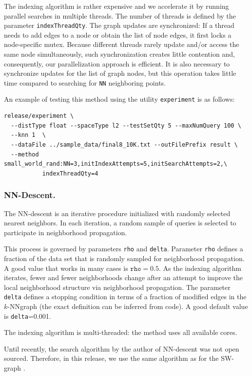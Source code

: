 \documentclass[runningheads,a4paper]{llncs}
\newcommand{\ttt}[1]{\texttt{#1}}
\newcommand{\knnns}{$k$-NN}
\begin{document}
The indexing algorithm is rather expensive and we accelerate it by running parallel searches in multiple threads. The number of threads is defined by the parameter \ttt{indexThreadQty}.
The graph updates are synchronized: If a thread  needs to add edges to a node or obtain
the list of node edges, it first locks a node-specific mutex.
Because different threads rarely update and/or access the same node simultaneously,
such synchronization creates little contention and, consequently,
our parallelization approach is efficient.
It is also necessary to synchronize updates for the list of graph nodes, 
but this operation takes little time compared to searching for \ttt{NN} neighboring points.

An example of testing this method using the utility \texttt{experiment} is as follows:
{
\footnotesize
\begin{verbatim}
release/experiment \
  --distType float --spaceType l2 --testSetQty 5 --maxNumQuery 100 \
  --knn 1  \
  --dataFile ../sample_data/final8_10K.txt --outFilePrefix result \
  --method small_world_rand:NN=3,initIndexAttempts=5,initSearchAttempts=2,\
           indexThreadQty=4 
\end{verbatim}
}


\subsubsection{NN-Descent.} \label{SectionNNDescent}
The NN-descent is an iterative procedure initialized with randomly selected
nearest neighbors. In each iteration, a random sample of queries is selected
to participate in neighborhood propagation.

This process is governed by parameters \ttt{rho} and \ttt{delta}. 
Parameter \ttt{rho} defines a fraction of the data set that is randomly
sampled for neighborhood propagation. A good value that works
in many cases is $\ttt{rho}=0.5$. As the indexing algorithm iterates,
fewer and fewer neighborhoods change after an attempt to improve the local
neighborhood structure via neighborhood propagation. 
The parameter \ttt{delta} defines a stopping condition in terms of a fraction
of modified edges in the \knnns graph (the exact definition can be inferred from code). 
A good default value is \ttt{delta}=0.001.

The indexing algorithm is multi-threaded: the method uses all available cores.

Until recently, the search algorithm by the author of NN-descent was not open sourced.
Therefore, in this release, we use the same algorithm as for the SW-graph \cite{malkov2012scalable,malkov2014}.
\end{document}
